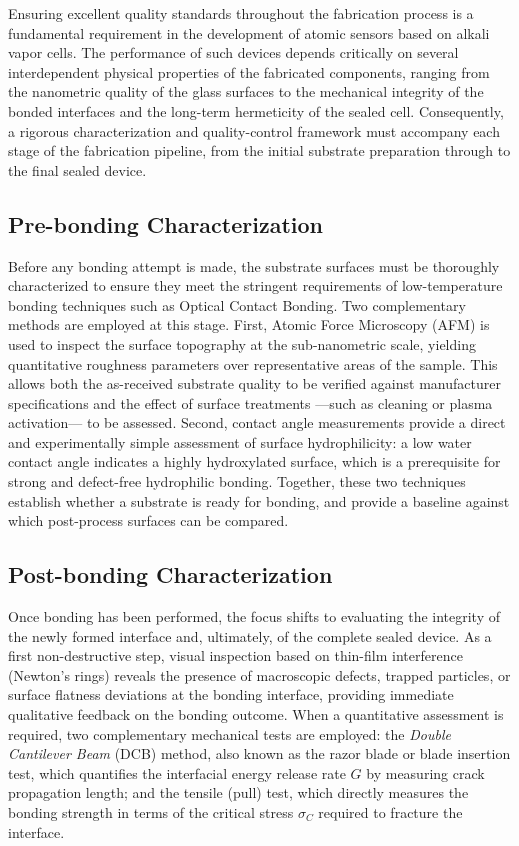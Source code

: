 \label{chap:qualitycontrol}
\FloatBarrier
Ensuring excellent quality standards throughout the fabrication process 
is a fundamental requirement in the development of atomic sensors based 
on alkali vapor cells. The performance of such devices depends critically 
on several interdependent physical properties of the fabricated components, 
ranging from the nanometric quality of the glass surfaces to the mechanical 
integrity of the bonded interfaces and the long-term hermeticity of the 
sealed cell. Consequently, a rigorous characterization and quality-control 
framework must accompany each stage of the fabrication pipeline, from 
the initial substrate preparation through to the final sealed device.

\subsection*{Pre-bonding Characterization}

Before any bonding attempt is made, the substrate surfaces must be 
thoroughly characterized to ensure they meet the stringent requirements 
of low-temperature bonding techniques such as Optical Contact Bonding. 
Two complementary methods are employed at this stage. First, Atomic 
Force Microscopy (\gls{AFM}) is used to inspect the surface topography 
at the sub-nanometric scale, yielding quantitative roughness parameters 
over representative areas of the sample. 
This allows both the as-received substrate quality to be verified against 
manufacturer specifications and the effect of surface treatments ---such 
as cleaning or plasma activation--- to be assessed. Second, contact angle 
measurements provide a direct and experimentally simple assessment of 
surface hydrophilicity: a low water contact angle indicates a highly 
hydroxylated surface, which is a prerequisite for strong and defect-free 
hydrophilic bonding. Together, these two techniques establish whether 
a substrate is ready for bonding, and provide a baseline against which 
post-process surfaces can be compared.

\subsection*{Post-bonding Characterization}

Once bonding has been performed, the focus shifts to evaluating the 
integrity of the newly formed interface and, ultimately, of the 
complete sealed device. As a first non-destructive step, visual 
inspection based on thin-film interference (Newton's rings) reveals 
the presence of macroscopic defects, trapped particles, or surface 
flatness deviations at the bonding interface, providing immediate 
qualitative feedback on the bonding outcome. When a quantitative 
assessment is required, two complementary mechanical tests are 
employed: the \textit{Double Cantilever Beam} (DCB) method, also 
known as the razor blade or blade insertion test, which quantifies 
the interfacial energy release rate $G$ by measuring crack propagation 
length; and the tensile (pull) test, which directly measures the 
bonding strength in terms of the critical stress $\sigma_C$ required 
to fracture the interface.

